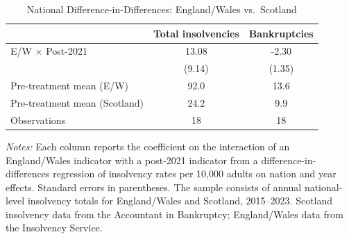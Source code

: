 \begin{table}[htbp]
\centering
\caption{National Difference-in-Differences: England/Wales vs.~Scotland}
\label{tab:national_did}
\begin{tabular}{lcc}
\hline\hline
 & Total insolvencies & Bankruptcies \\
\hline
E/W $\times$ Post-2021 & 13.08 & -2.30 \\
 & (9.14) & (1.35) \\
\addlinespace
Pre-treatment mean (E/W) & 92.0 & 13.6 \\
Pre-treatment mean (Scotland) & 24.2 & 9.9 \\
Observations & 18 & 18 \\
\hline\hline
\end{tabular}
\begin{tablenotes}
\item \textit{Notes:} Each column reports the coefficient on the interaction of an England/Wales indicator with a post-2021 indicator from a difference-in-differences regression of insolvency rates per 10,000 adults on nation and year effects. Standard errors in parentheses. The sample consists of annual national-level insolvency totals for England/Wales and Scotland, 2015--2023. Scotland insolvency data from the Accountant in Bankruptcy; England/Wales data from the Insolvency Service.
\end{tablenotes}
\end{table}

